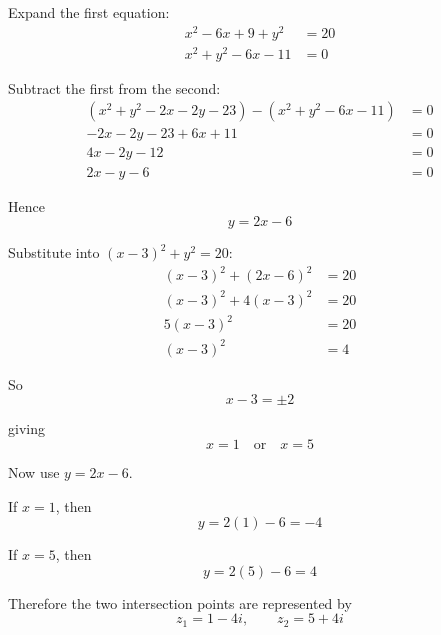 \documentclass[leqno]{article}
\begin{document}
\begin{enumerate}[
  label=\textbf{\arabic*.},
  leftmargin=*,
  topsep=0pt,
  partopsep=0pt,
  parsep=0pt
]
\begin{djsSolution}
\begin{enumerate}[label=\textbf{(\alph*)}]
  Expand the first equation:
  \begin{align*}
  x^2-6x+9+y^2&=20 \\
  x^2+y^2-6x-11&=0
  \end{align*}

  Subtract the first from the second:
  \begin{align*}
  (x^2+y^2-2x-2y-23)-(x^2+y^2-6x-11)&=0 \\
  -2x-2y-23+6x+11&=0 \\
  4x-2y-12&=0 \\
  2x-y-6&=0
  \end{align*}

  Hence
  \[
  y=2x-6
  \]

  Substitute into $(x-3)^2+y^2=20$:
  \begin{align*}
  (x-3)^2+(2x-6)^2&=20 \\
  (x-3)^2+4(x-3)^2&=20 \\
  5(x-3)^2&=20 \\
  (x-3)^2&=4
  \end{align*}

  So
  \[
  x-3=\pm2
  \]

  giving
  \[
  x=1 \quad \text{or} \quad x=5
  \]

  Now use $y=2x-6$.

  If $x=1$, then
  \[
  y=2(1)-6=-4
  \]

  If $x=5$, then
  \[
  y=2(5)-6=4
  \]

  Therefore the two intersection points are represented by
  \[
  z_1=1-4i, \qquad z_2=5+4i
  \]

\end{enumerate}
\end{djsSolution}


\newpage

\questionitem


\end{enumerate}
\end{document}
